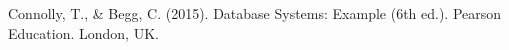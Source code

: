\documentclass[a4paper,12pt]{scrreprt}
\begin{document}

\renewcommand\bibname{Referências}

\begin{thebibliography}{9}

Connolly, T., \& Begg, C. (2015). Database Systems: Example (6th ed.). Pearson Education. London, UK.


\end{thebibliography}






\end{document}
